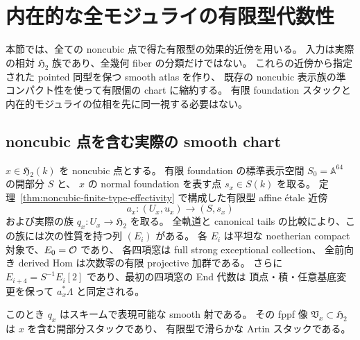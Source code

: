 \section{内在的な全モジュライの有限型代数性}
\label{sec:global-h2-smooth-atlas}

本節では、全ての noncubic 点で得た有限型の効果的近傍を用いる。
入力は実際の相対 $\mathfrak H_2$ 族であり、全幾何 fiber の分類だけではない。
これらの近傍から指定された pointed 同型を保つ smooth atlas を作り、
既存の noncubic 表示族の準コンパクト性を使って有限個の chart に縮約する。
有限 foundation スタックと内在的モジュライの位相を先に同一視する必要はない。

\subsection{noncubic 点を含む実際の smooth chart}

\begin{corollary}
\label{cor:noncubic-effective-smooth-neighborhood}
$x\in\mathfrak H_2(k)$ を noncubic 点とする。
有限 foundation の標準表示空間 $S_0=\mathbb A^{64}$ の開部分 $S$ と、
$x$ の normal foundation を表す点 $s_x\in S(k)$ を取る。
定理~\ref{thm:noncubic-finite-type-effectivity} で構成した有限型 affine étale 近傍
\[
 a_x:(U_x,u_x)\longrightarrow(S,s_x)
\]
および実際の族 $q_x:U_x\to\mathfrak H_2$ を取る。
全軌道と canonical tails の比較により、この族には次の性質を持つ列 $(E_i)$ がある。
各 $E_i$ は平坦な noetherian compact 対象で、$E_0=\mathcal O$ であり、
各四項窓は full strong exceptional collection、
全前向き derived Hom は次数零の有限 projective 加群である。
さらに $E_{i+4}=S^{-1}E_i[2]$ であり、最初の四項窓の End 代数は
頂点・積・任意基底変更を保って $a_x^*\Lambda$ と同定される。

このとき $q_x$ はスキームで表現可能な smooth 射である。
その fppf 像 $\mathfrak V_x\subset\mathfrak H_2$ は $x$ を含む開部分スタックであり、
有限型で滑らかな Artin スタックである。
\end{corollary}

